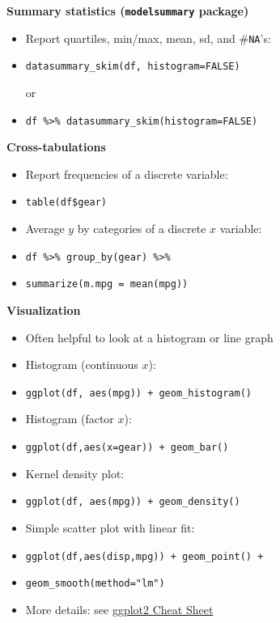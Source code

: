 \documentclass[10pt,landscape]{article}
\begin{document}
\begin{multicols}{3}
\smallskip{}

\textbf{Summary statistics (\texttt{modelsummary} package)}\\
\begin{itemize}
    \item Report quartiles, min/max, mean, sd, and \#\verb!NA!'s:
    \item[] \verb!datasummary_skim(df, histogram=FALSE)!
    
    or
    \item[] \verb!df %>% datasummary_skim(histogram=FALSE)!
\end{itemize}

\smallskip{}

\textbf{Cross-tabulations}\\
\begin{itemize}
    \item Report frequencies of a discrete variable:
    \item[] \verb!table(df$gear)!
    \item Average $y$ by categories of a discrete $x$ variable:
    \item[] \verb!df %>% group_by(gear) %>% !
    \item[] \verb!summarize(m.mpg = mean(mpg))!
\end{itemize}

\smallskip{}

\textbf{Visualization}\\
\begin{itemize}
    \item Often helpful to look at a histogram or line graph
    \item Histogram (continuous $x$):
    \item[] \verb!ggplot(df, aes(mpg)) + geom_histogram()!
    \item Histogram (factor $x$):
    \item[] \verb!ggplot(df,aes(x=gear)) + geom_bar()!
    \item Kernel density plot:
    \item[] \verb!ggplot(df, aes(mpg)) + geom_density()!
    \item Simple scatter plot with linear fit:
    \item[] \verb!ggplot(df,aes(disp,mpg)) + geom_point() +!
    \item[] \verb!geom_smooth(method="lm")!
    \item More details: see \href{https://www.rstudio.com/wp-content/uploads/2015/03/ggplot2-cheatsheet.pdf}{ggplot2 Cheat Sheet}
\end{itemize}



\end{multicols}
\end{document}
